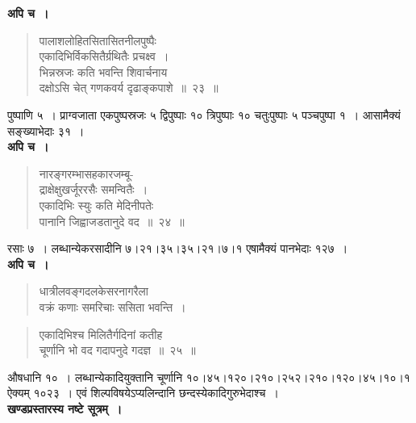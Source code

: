 \documentclass[11pt, openany]{book}
\begin{document}
\textbf{अपि च~।}

\begin{quote}
{\ex पालाशलोहितसितासितनीलपुष्पैः\\
एकादिभिर्विकसितैर्ग्रथितैः प्रचक्ष्व~।\\
भिन्नस्रजः कति भवन्ति शिवार्चनाय\\
दक्षोऽसि चेत् गणकवर्य दृढाङ्कपाशे~॥~२३~॥}
\end{quote}

पुष्पाणि ५~। प्राग्वजाता एकपुष्पस्रजः ५ द्विपुष्पाः १० त्रिपुष्पाः १० चतुःपुष्पाः ५ पञ्चपुष्पा १~। आसामैक्यं सङ्ख्याभेदाः ३१~।\\

\textbf{अपि च~।}

\begin{quote}
{\ex नारङ्गरम्भासहकारजम्बू-\\
द्राक्षेक्षुखर्जूररसैः समन्वितैः~।\\
एकादिभिः स्युः कति मेदिनीपतेः\\
पानानि जिह्वाजडतानुदे वद~॥~२४~॥	}
\end{quote}

रसाः ७~। लब्धान्येकरसादीनि ७।२१।३५।३५।२१।७।१ एषामैक्यं पानभेदाः १२७~।\\

\textbf{अपि च~।}
\begin{quote}
{\ex धात्रीलवङ्गदलकेसरनागरैला\\
वक्रं कणाः समरिचाः ससिता भवन्ति~।}
\end{quote}

\newpage

\begin{quote}
{\ex एकादिभिश्च मिलितैर्गदिनां कतीह\\
चूर्णानि भो वद गदापनुदे गदज्ञ~॥~२५~॥	}
\end{quote}

औषधानि १०~। लब्धान्येकादियुक्तानि चूर्णानि १०।४५।१२०।२१०।२५२।२१०।१२०।४५।१०।१ ऐक्यम् १०२३~। एवं शिल्पविषयेऽप्यलिन्दानि छन्दस्येकादिगुरुभेदाश्च~।\\

\textbf{खण्डप्रस्तारस्य नष्टे सूत्रम्~।}
\end{document}
